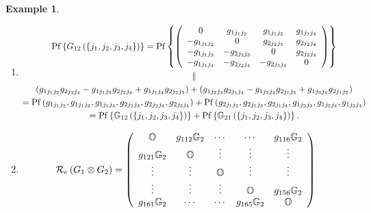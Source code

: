 \documentclass[aps,preprint]{revtex4}%
\newtheorem{example}[theorem]{Example}
\begin{document}
\begin{enumerate}
\begin{example}
\begin{enumerate}
\item
\begin{gather}
\operatorname{Pf}\left\{  G_{12}\left(  \left\{  j_{1},j_{2},j_{3}%
,j_{4}\right\}  \right)  \right\}  =\operatorname{Pf}\left\{  \left(
\begin{array}
[c]{cccc}%
0 & g_{1j_{1}j_{2}} & g_{1j_{1}j_{3}} & g_{1j_{1}j_{4}}\\
-g_{1j_{1}j_{2}} & 0 & g_{2j_{2}j_{3}} & g_{2j_{2}j_{4}}\\
-g_{1j_{1}j_{3}} & -g_{2j_{2}j_{3}} & 0 & g_{2j_{3}j_{4}}\\
-g_{1j_{1}j_{4}} & -g_{2j_{2}j_{4}} & -g_{2j_{3}j_{4}} & 0
\end{array}
\right)  \right\} \\
\parallel\\
\left(  g_{1j_{1}j_{2}}g_{2j_{3}j_{4}}-g_{1j_{1}j_{3}}g_{2j_{2}j_{4}%
}+g_{1j_{1}j_{4}}g_{2j_{2}j_{3}}\right)  +\left(  g_{1j_{2}j_{3}}%
g_{2j_{1}j_{4}}-g_{1j_{2}j_{4}}g_{2j_{1}j_{3}}+g_{1j_{3}j_{4}}g_{2j_{1}j_{2}%
}\right) \\
=\operatorname{Pf}\left(  g_{1j_{1}j_{2}},g_{1j_{1}j_{3}},g_{1j_{1}j_{4}%
},g_{2j_{2}j_{3}},g_{2j_{2}j_{4}},g_{2j_{3}j_{4}}\right)  +\operatorname{Pf}%
\left(  g_{2j_{1}j_{2}},g_{2j_{1}j_{3}},g_{2j_{1}j_{4}},g_{1j_{2}j_{3}%
},g_{1j_{2}j_{4}},g_{1j_{3}j_{4}}\right) \\
=\operatorname{Pf}\left\{  \mathbb{G}_{12}\left(  \left\{  j_{1},j_{2}%
,j_{3},j_{4}\right\}  \right)  \right\}  +\operatorname{Pf}\left\{
\mathbb{G}_{21}\left(  \left\{  j_{1},j_{2},j_{3},j_{4}\right\}  \right)
\right\}  .
\end{gather}


\item
\begin{equation}
\mathcal{R}_{e}\left(  G_{1}\otimes G_{2}\right)  =\left(
\begin{array}
[c]{ccccc}%
\mathbb{O} & g_{112}\mathbb{G}_{2} & \cdots & \cdots & g_{116}\mathbb{G}_{2}\\
g_{121}\mathbb{G}_{2} & \mathbb{O} & \vdots & \vdots & \vdots\\
\vdots & \vdots & \mathbb{O} & \vdots & \vdots\\
\vdots & \vdots & \vdots & \mathbb{O} & g_{156}\mathbb{G}_{2}\\
g_{161}\mathbb{G}_{2} & \cdots & \cdots & g_{165}\mathbb{G}_{2} & \mathbb{O}%
\end{array}
\right)
\end{equation}



\end{enumerate}
\end{example}
\end{enumerate}
\end{document}
